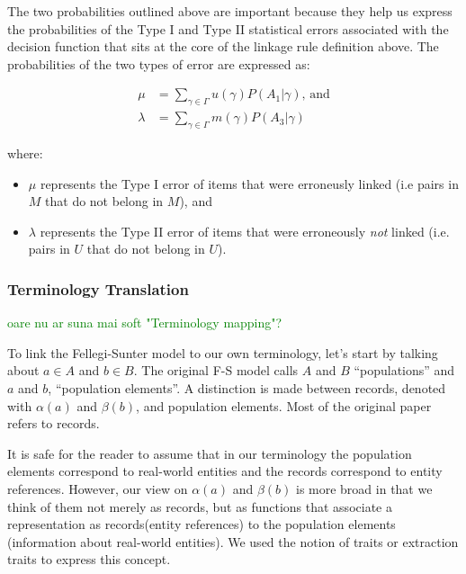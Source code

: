 \documentclass[11pt]{article}
\begin{document}
    The two probabilities outlined above are important because they help us
    express the probabilities of the Type I and Type II statistical errors
    associated with the decision function that sits at the core of the linkage
    rule definition above.
    The probabilities of the two types of error are expressed as:

    \begin{align}
        \mu&=\sum_{\gamma \in \varGamma}u(\gamma)P(A_1|\gamma)\textrm{,~and}\nonumber\\
        \lambda&=\sum_{\gamma \in \varGamma}m(\gamma)P(A_3|\gamma)\nonumber
    \end{align}

    where:

    \begin{itemize}
        \item $\mu$ represents the Type I error of items that were erroneusly
        linked (i.e pairs in $M$ that do not belong in $M$), and
        \item $\lambda$ represents the Type II error of items that were
        erroneously \textit{not} linked (i.e. pairs in $U$ that do not belong in
        $U$).
    \end{itemize}

    \subsubsection[fms-term]{Terminology Translation}\label{fsm-term}
    \textcolor{green}{oare nu ar suna mai soft "Terminology mapping"?}

    To link the Fellegi-Sunter model to our own terminology, let's start by
    talking about $a \in A$ and $b \in B$.
    The original F-S model calls $A$ and $B$ ``populations'' and $a$ and $b$,
    ``population elements''.
    A distinction is made between records, denoted with $\alpha(a)$ and
    $\beta(b)$, and population elements.
    Most of the original paper refers to records.

    It is safe for the reader to assume that in our terminology the population
    elements correspond to real-world entities and the records correspond to
    entity references.
    However, our view on $\alpha(a)$ and $\beta(b)$ is more broad in that we
    think of them not merely as records, but as functions that associate a
    representation as records(entity references) to the population elements
    (information about real-world entities).
    We used the notion of traits or extraction traits to express this concept.
        
\end{document}
